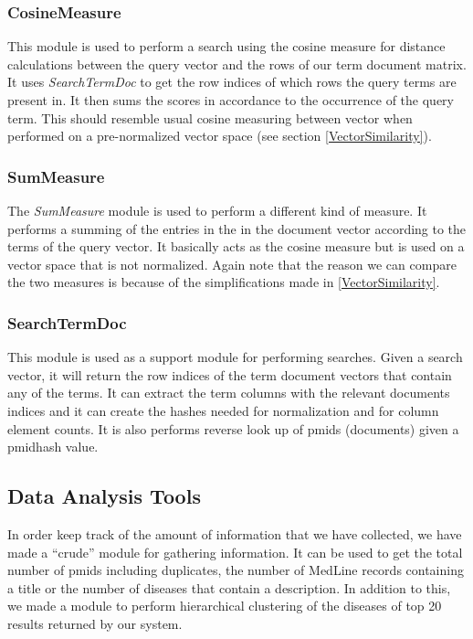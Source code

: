 \subsubsection{CosineMeasure}
This module is used to perform a search using the cosine measure for
distance calculations between the query vector and the rows of our
term document matrix. It uses \textit{SearchTermDoc} to get the row
indices of which rows the query terms are present in. It then sums the
scores in accordance to the occurrence of the query term. This should
resemble usual cosine measuring between vector when performed on a
pre-normalized vector space (see section \ref{VectorSimilarity}).

\subsubsection{SumMeasure}
The \textit{SumMeasure} module is used to perform a different kind of
measure. It performs a summing of the entries in the in the document
vector according to the terms of the query vector. It basically acts
as the cosine measure but is used on a vector space that is not
normalized. Again note that the reason we can compare the two measures
is because of the simplifications made in \ref{VectorSimilarity}.

\subsubsection{SearchTermDoc}
This module is used as a support module for performing searches. Given
a search vector, it will return the row indices of the term document
vectors that contain any of the terms. It can extract the term columns
with the relevant documents indices and it can create the hashes
needed for normalization and for column element counts. It is also
performs reverse look up of pmids (documents) given a pmidhash value.

\subsection{Data Analysis Tools}

In order keep track of the amount of information that we have
collected, we have made a ``crude'' module for gathering information. It
can be used to get the total number of pmids including duplicates, the
number of MedLine records containing a title or the number of diseases
that contain a description. In addition to this, we made a module to
perform hierarchical clustering of the diseases of top 20 results
returned by our system.


